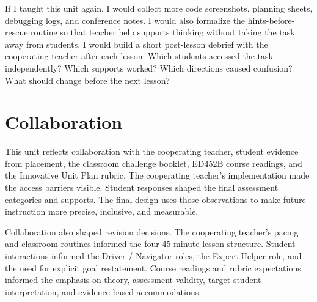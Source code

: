 \documentclass[12pt]{article}
\begin{document}
If I taught this unit again, I would collect more code screenshots, planning sheets, debugging logs, and conference notes. I would also formalize the hints-before-rescue routine so that teacher help supports thinking without taking the task away from students. I would build a short post-lesson debrief with the cooperating teacher after each lesson: Which students accessed the task independently? Which supports worked? Which directions caused confusion? What should change before the next lesson?

\section{Collaboration}

This unit reflects collaboration with the cooperating teacher, student evidence from placement, the classroom challenge booklet, ED452B course readings, and the Innovative Unit Plan rubric. The cooperating teacher's implementation made the access barriers visible. Student responses shaped the final assessment categories and supports. The final design uses those observations to make future instruction more precise, inclusive, and measurable.

Collaboration also shaped revision decisions. The cooperating teacher's pacing and classroom routines informed the four 45-minute lesson structure. Student interactions informed the Driver / Navigator roles, the Expert Helper role, and the need for explicit goal restatement. Course readings and rubric expectations informed the emphasis on theory, assessment validity, target-student interpretation, and evidence-based accommodations.

\newpage
\end{document}
